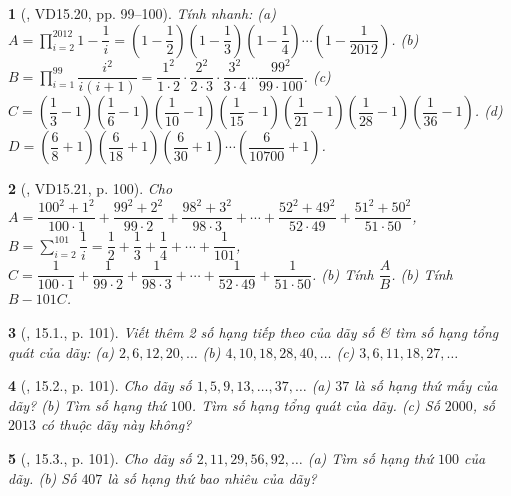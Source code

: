 \documentclass{article}
\newtheorem{baitoan}{}
\begin{document}
\begin{baitoan}[\cite{TLCT_THCS_Toan_6_so_hoc}, VD15.20, pp. 99--100]
	Tính nhanh: (a) $A = \prod_{i=2}^{2012} 1  - \dfrac{1}{i} = \left(1 - \dfrac{1}{2}\right)\left(1 - \dfrac{1}{3}\right)\left(1 - \dfrac{1}{4}\right)\cdots\left(1 - \dfrac{1}{2012}\right)$. (b) $B = \prod_{i=1}^{99} \dfrac{i^2}{i(i + 1)} = \dfrac{1^2}{1\cdot2}\cdot\dfrac{2^2}{2\cdot3}\cdot\dfrac{3^2}{3\cdot4}\cdots\dfrac{99^2}{99\cdot100}$. (c) $C = \left(\dfrac{1}{3} - 1\right)\left(\dfrac{1}{6} - 1\right)\left(\dfrac{1}{10} - 1\right)\left(\dfrac{1}{15} - 1\right)\left(\dfrac{1}{21} - 1\right)\left(\dfrac{1}{28} - 1\right)\left(\dfrac{1}{36} - 1\right)$. (d) $D = \left(\dfrac{6}{8} + 1\right)\left(\dfrac{6}{18} + 1\right)\left(\dfrac{6}{30} + 1\right)\cdots\left(\dfrac{6}{10700} + 1\right)$.
\end{baitoan}

\begin{baitoan}[\cite{TLCT_THCS_Toan_6_so_hoc}, VD15.21, p. 100]
	Cho $A = \dfrac{100^2 + 1^2}{100\cdot1} + \dfrac{99^2 + 2^2}{99\cdot2} + \dfrac{98^2 + 3^2}{98\cdot3} + \cdots + \dfrac{52^2 + 49^2}{52\cdot49} + \dfrac{51^2 + 50^2}{51\cdot50}$, $B = \sum_{i=2}^{101} \dfrac{1}{i} = \dfrac{1}{2} + \dfrac{1}{3} + \dfrac{1}{4} + \cdots + \dfrac{1}{101}$, $C = \dfrac{1}{100\cdot1} + \dfrac{1}{99\cdot2} + \dfrac{1}{98\cdot3} + \cdots + \dfrac{1}{52\cdot49} + \dfrac{1}{51\cdot50}$. (b) Tính $\dfrac{A}{B}$. (b) Tính $B - 101C$.
\end{baitoan}

\begin{baitoan}[\cite{TLCT_THCS_Toan_6_so_hoc}, 15.1., p. 101]
	Viết thêm 2 số hạng tiếp theo của dãy số \& tìm số hạng tổng quát của dãy: (a) $2,6,12,20,\ldots$ (b) $4,10,18,28,40,\ldots$ (c) $3,6,11,18,27,\ldots$
\end{baitoan}

\begin{baitoan}[\cite{TLCT_THCS_Toan_6_so_hoc}, 15.2., p. 101]
	Cho dãy số $1,5,9,13,\ldots,37,\ldots$ (a) $37$ là số hạng thứ mấy của dãy? (b) Tìm số hạng thứ $100$. Tìm số hạng tổng quát của dãy. (c) Số $2000$, số $2013$ có thuộc dãy này không?
\end{baitoan}

\begin{baitoan}[\cite{TLCT_THCS_Toan_6_so_hoc}, 15.3., p. 101]
	Cho dãy số $2,11,29,56,92,\ldots$ (a) Tìm số hạng thứ $100$ của dãy. (b) Số $407$ là số hạng thứ bao nhiêu của dãy?
\end{baitoan}
\end{document}
